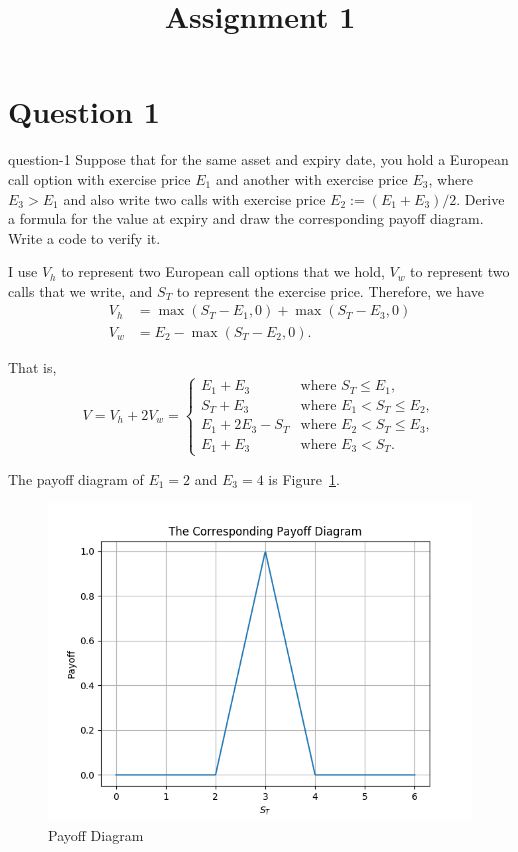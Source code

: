 \title{Assignment 1}
\maketitle\tableofcontents

\section{Question 1}
\begin{statebox}{}{question-1}
    Suppose that for the same asset and expiry date, you hold a European call option with exercise price $E_1$ and another with exercise price $E_3$, where $E_3>E_1$ and also write two calls with exercise price $E_2:=(E_1+E_3)/2$. Derive a formula for the value at expiry and draw the corresponding payoff diagram. Write a code to verify it.
\end{statebox}
I use $V_h$ to represent two European call options that we hold, $V_w$ to represent two calls that we write, and $S_T$ to represent the exercise price. Therefore, we have
\begin{equation}\label{E:value-at-expiry-1}
    \begin{aligned}
        V_h &= \max(S_T-E_1, 0) + \max(S_T-E_3, 0) \\
        V_w &= E_2 - \max(S_T-E_2, 0).
    \end{aligned}
\end{equation}

That is,
\begin{equation}\label{E:value-at-expiry-2}
    V = V_h + 2V_w = \begin{cases}
        E_1+E_3 & \text{where } S_T\leq E_1, \\
        S_T+E_3 & \text{where } E_1<S_T\leq E_2, \\
        E_1+2E_3-S_T & \text{where } E_2<S_T\leq E_3, \\
        E_1+E_3 & \text{where } E_3<S_T.
    \end{cases}
\end{equation}

The payoff diagram of $E_1=2$ and $E_3=4$ is Figure~\ref{F:payoff-diagram}.
\begin{figure}[H]
    \centering
    \includegraphics[width=.7\textwidth]{figures/2019-09-27-payoff-diagram.png}
    \caption{Payoff Diagram}\label{F:payoff-diagram}
\end{figure}

